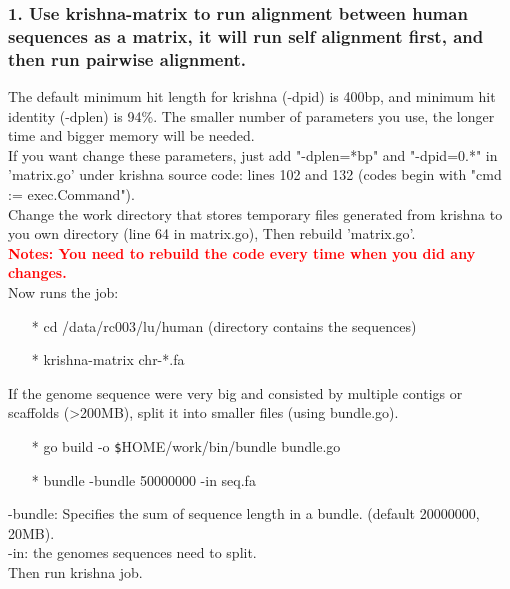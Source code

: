 \documentclass[12pt]{report}
\begin{document}
\subsubsection{1. Use krishna-matrix to run alignment between human sequences as a matrix, it will run self alignment first, and then run pairwise alignment.}

The default minimum hit length for krishna (-dpid) is 400bp, and minimum hit identity (-dplen) is 94\%. The smaller number of parameters you use, the longer time and bigger memory will be needed. \\

If you want change these parameters, just add "-dplen=*bp" and "-dpid=0.*" in 'matrix.go' under krishna source code: lines 102 and 132 (codes begin with "cmd := exec.Command").\\

Change the work directory that stores temporary files generated from krishna to you own directory (line 64 in matrix.go), Then rebuild 'matrix.go'. \\

\textbf{\textcolor{red}{Notes: You need to rebuild the code every time when you did any changes. }} \\

Now runs the job:

\begin{enumerate}
	\item[*] cd /data/rc003/lu/human (directory contains the sequences)
	\item[*] krishna-matrix chr-*.fa
\end{enumerate}

\noindent If the genome sequence were very big and consisted by multiple contigs or scaffolds (>200MB), split it into smaller files (using bundle.go).\\

\begin{enumerate}
	\item[*] go build -o \texttt{\$}HOME/work/bin/bundle bundle.go
	\item[*] bundle -bundle 50000000 -in seq.fa
\end{enumerate}

-bundle: Specifies the sum of sequence length in a bundle. (default 20000000, 20MB).\\
-in: the genomes sequences need to split.\\
Then run krishna job.\\
\end{document}
